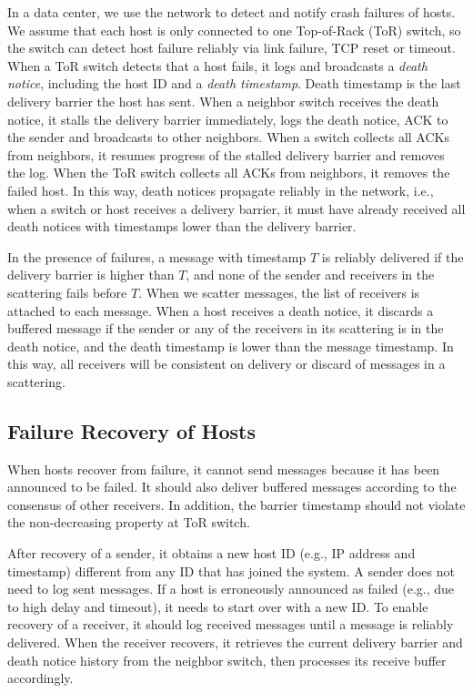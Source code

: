 {
In a data center, we use the network to detect and notify crash failures of hosts.
We assume that each host is only connected to one Top-of-Rack (ToR) switch, so the switch can detect host failure reliably via link failure, TCP reset or timeout.
When a ToR switch detects that a host fails, it logs and broadcasts a \emph{death notice}, including the host ID and a \emph{death timestamp}.
Death timestamp is the last delivery barrier the host has sent.
When a neighbor switch receives the death notice, it stalls the delivery barrier immediately, logs the death notice, ACK to the sender and broadcasts to other neighbors.
When a switch collects all ACKs from neighbors, it resumes progress of the stalled delivery barrier and removes the log.
When the ToR switch collects all ACKs from neighbors, it removes the failed host.
In this way, death notices propagate reliably in the network, i.e., when a switch or host receives a delivery barrier, it must have already received all death notices with timestamps lower than the delivery barrier.

In the presence of failures, a message with timestamp $T$ is reliably delivered if the delivery barrier is higher than $T$, and none of the sender and receivers in the scattering fails before $T$.
When we scatter messages, the list of receivers is attached to each message.
When a host receives a death notice, it discards a buffered message if the sender or any of the receivers in its scattering is in the death notice, and the death timestamp is lower than the message timestamp.
In this way, all receivers will be consistent on delivery or discard of messages in a scattering.

\subsection{Failure Recovery of Hosts}
\label{sec:failure-recovery}

When hosts recover from failure, it cannot send messages because it has been announced to be failed.
It should also deliver buffered messages according to the consensus of other receivers.
In addition, the barrier timestamp should not violate the non-decreasing property at ToR switch.

After recovery of a sender, it obtains a new host ID (e.g., IP address and timestamp) different from any ID that has joined the system. 
A sender does not need to log sent messages.
If a host is erroneously announced as failed (e.g., due to high delay and timeout), it needs to start over with a new ID.
To enable recovery of a receiver, it should log received messages until a message is reliably delivered.
When the receiver recovers, it retrieves the current delivery barrier and death notice history from the neighbor switch, then processes its receive buffer accordingly.

}
